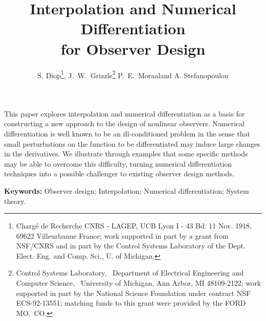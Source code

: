 
\def\thesubsubsection{\thesubsection\arabic{subsubsection}.}



\title{Interpolation and Numerical Differentiation \\
for Observer Design}

\author{S. Diop\thanks{Charg\'e de Recherche CNRS - LAGEP, UCB Lyon I - 43 Bd.
11 Nov. 1918, 69622 Villeurbanne France;
work supported in part by a grant from NSF/CNRS and in part 
by the Control Systems Laboratory of
the Dept. Elect. Eng. and Comp. Sci., U. of Michigan.}, 
J.\ W.\ Grizzle\thanks{Control Systems Laboratory, \
Department of Electrical Engineering and Computer
Science, \ University of Michigan, Ann Arbor, MI 48109-2122;
work supported in part by the National Science
Foundation under contract NSF ECS-92-13551; matching funds to this grant were
provided by the FORD MO.\ CO.}
P.\ E.\ Moraal\footnotemark[2] and A. Stefanopoulou\footnotemark[2] }

\maketitle



\abstract  
This paper explores interpolation and numerical differentiation
as a basis for constructing a new approach to the design of nonlinear
observers.  
Numerical differentiation is well known to be an ill-conditioned problem in the
sense that small perturbations on the function to be differentiated may induce
large changes in the derivatives.
We illustrate through examples that some specific methods may be able to overcome this
difficulty, turning numerical differentiation techniques into a possible
challenger to existing observer design methods.

\medskip\noindent
{\bf Keywords:}
Observer design; Interpolation; Numerical differentiation; System theory. 

